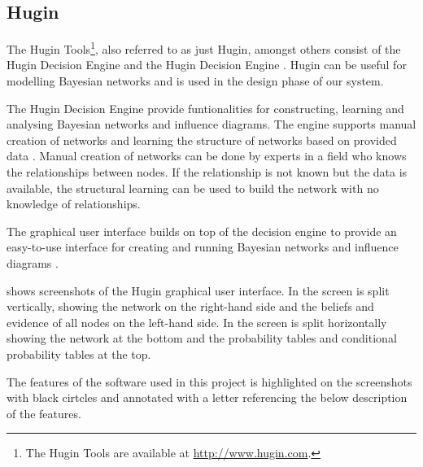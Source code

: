 \subsection{Hugin}
\label{sec:analysis:bayesian-network:hugin}

The Hugin Tools\footnote{The Hugin Tools are available at \url{http://www.hugin.com}.}, also referred to as just Hugin, amongst others consist of the Hugin Decision Engine and the Hugin Decision Engine \cite{jensen2005hugin}. Hugin can be useful for modelling Bayesian networks and is used in the design phase of our system.

The Hugin Decision Engine provide funtionalities for constructing, learning and analysing Bayesian networks and influence diagrams. The engine supports manual creation of networks and learning the structure of networks based on provided data \cite{jensen2005hugin}. Manual creation of networks can be done by experts in a field who knows the relationships between nodes. If the relationship is not known but the data is available, the structural learning can be used to build the network with no knowledge of relationships.

The graphical user interface builds on top of the decision engine to provide an easy-to-use interface for creating and running Bayesian networks and influence diagrams \cite{jensen2005hugin}.

 shows screenshots of the Hugin graphical user interface.
In  the screen is split vertically, showing the network on the right-hand side and the beliefs and evidence of all nodes on the left-hand side. In  the screen is split horizontally showing the network at the bottom and the probability tables and conditional probability tables at the top.

The features of the software used in this project is highlighted on the screenshots with black cirtcles and annotated with a letter referencing the below description of the features.

